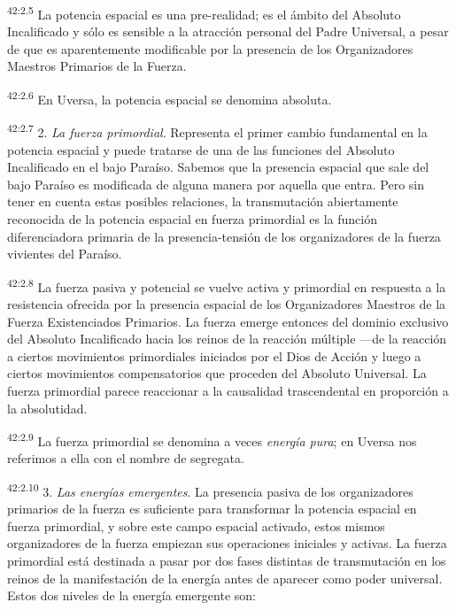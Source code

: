 \par
\textsuperscript{42:2.5} La potencia espacial es una pre-realidad; es el ámbito del Absoluto Incalificado y sólo es sensible a la atracción personal del Padre Universal, a pesar de que es aparentemente modificable por la presencia de los Organizadores Maestros Primarios de la Fuerza.

\par
\textsuperscript{42:2.6} En Uversa, la potencia espacial se denomina absoluta.

\par
\textsuperscript{42:2.7} 2. \textit{La fuerza primordial}. Representa el primer cambio fundamental en la potencia espacial y puede tratarse de una de las funciones del Absoluto Incalificado en el bajo Paraíso. Sabemos que la presencia espacial que sale del bajo Paraíso es modificada de alguna manera por aquella que entra. Pero sin tener en cuenta estas posibles relaciones, la transmutación abiertamente reconocida de la potencia espacial en fuerza primordial es la función diferenciadora primaria de la presencia-tensión de los organizadores de la fuerza vivientes del Paraíso.

\par
\textsuperscript{42:2.8} La fuerza pasiva y potencial se vuelve activa y primordial en respuesta a la resistencia ofrecida por la presencia espacial de los Organizadores Maestros de la Fuerza Existenciados Primarios. La fuerza emerge entonces del dominio exclusivo del Absoluto Incalificado hacia los reinos de la reacción múltiple ---de la reacción a ciertos movimientos primordiales iniciados por el Dios de Acción y luego a ciertos movimientos compensatorios que proceden del Absoluto Universal. La fuerza primordial parece reaccionar a la causalidad trascendental en proporción a la absolutidad.

\par
\textsuperscript{42:2.9} La fuerza primordial se denomina a veces \textit{energía pura}; en Uversa nos referimos a ella con el nombre de segregata.

\par
\textsuperscript{42:2.10} 3. \textit{Las energías emergentes}. La presencia pasiva de los organizadores primarios de la fuerza es suficiente para transformar la potencia espacial en fuerza primordial, y sobre este campo espacial activado, estos mismos organizadores de la fuerza empiezan sus operaciones iniciales y activas. La fuerza primordial está destinada a pasar por dos fases distintas de transmutación en los reinos de la manifestación de la energía antes de aparecer como poder universal. Estos dos niveles de la energía emergente son:

